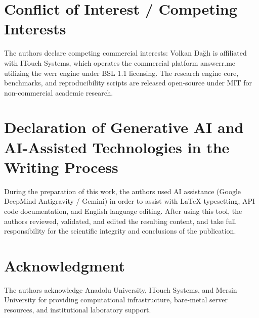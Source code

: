 \documentclass[10pt,journal,compsoc,twocolumn]{article}
\begin{document}
\section*{Conflict of Interest / Competing Interests}
The authors declare competing commercial interests: Volkan Dağlı is affiliated with ITouch Systems, which operates the commercial platform answerr.me utilizing the werr engine under BSL 1.1 licensing. The research engine core, benchmarks, and reproducibility scripts are released open-source under MIT for non-commercial academic research.

\section*{Declaration of Generative AI and AI-Assisted Technologies in the Writing Process}
During the preparation of this work, the authors used AI assistance (Google DeepMind Antigravity / Gemini) in order to assist with LaTeX typesetting, API code documentation, and English language editing. After using this tool, the authors reviewed, validated, and edited the resulting content, and take full responsibility for the scientific integrity and conclusions of the publication.

\section*{Acknowledgment}
The authors acknowledge Anadolu University, ITouch Systems, and Mersin University for providing computational infrastructure, bare-metal server resources, and institutional laboratory support.



\end{document}
